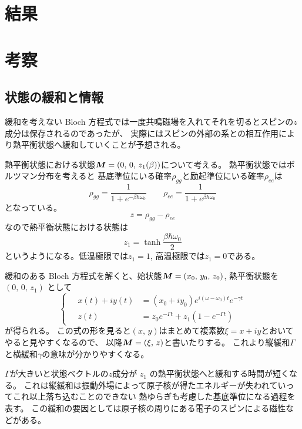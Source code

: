 \documentclass[11pt,dvipdfmx,a4paper]{jsarticle}
\begin{document}
\section{結果}

\section{考察}
\subsection{状態の緩和と情報}
緩和を考えない Bloch 方程式では一度共鳴磁場を入れてそれを切るとスピンの\(z\)成分は保存されるのであったが、
実際にはスピンの外部の系との相互作用により熱平衡状態へ緩和していくことが予想される。

熱平衡状態における状態\(\vb*{M}=(0,\,0,\,z_{1}(\beta))\)について考える。
熱平衡状態ではボルツマン分布を考えると
基底準位にいる確率\(\rho_{gg}\)と励起準位にいる確率\(\rho_{ee}\)は
\begin{equation}
	\rho_{gg} = \frac{1}{1 + e^{-\beta \hbar\omega_0}} \qquad
	\rho_{ee} = \frac{1}{1 + e^{\beta \hbar\omega_0}}
\end{equation}
となっている。
\begin{equation}
	z = \rho_{gg} - \rho_{ee}
\end{equation}
なので熱平衡状態における状態は
\begin{equation}
	z_{1} = \tanh{\frac{\beta\hbar\omega_0}{2}}
\end{equation}
というようになる。低温極限では\(z_{1}=1\), 高温極限では\(z_{1} = 0\)である。

緩和のある Bloch 方程式を解くと、始状態\(\vb*{M}=\qty(x_0,\,y_0,\,z_0)\), 熱平衡状態を\((0,\,0,\,z_{1})\)
として
\begin{equation}
	\left\{\quad
	\begin{aligned}
		x(t) + iy(t) &= (x_0 + iy_0) e^{i(\omega-\omega_0)t}e^{-\gamma t}\\
		z(t) &= z_0 e^{-\Gamma t} + z_{1}(1-e^{-\Gamma t})
	\end{aligned}\right. \label{eq:relaxed_Bloch_sol}
\end{equation}
が得られる。
この式の形を見ると\((x,\,y)\)はまとめて複素数\(\xi = x + iy\)とおいてやると見やすくなるので、
以降\(\vb*{M}=(\xi,\,z)\)と書いたりする。
これより縦緩和\(\Gamma\)と横緩和\(\gamma\)の意味が分かりやすくなる。

\(\Gamma\)が大きいと状態ベクトルの\(z\)成分が \(z_1\) の熱平衡状態へと緩和する時間が短くなる。
これは縦緩和は振動外場によって原子核が得たエネルギーが失われていってこれ以上落ち込むことのできない
熱ゆらぎも考慮した基底準位になる過程を表す。
この緩和の要因としては原子核の周りにある電子のスピンによる磁性などがある。%
\end{document}
